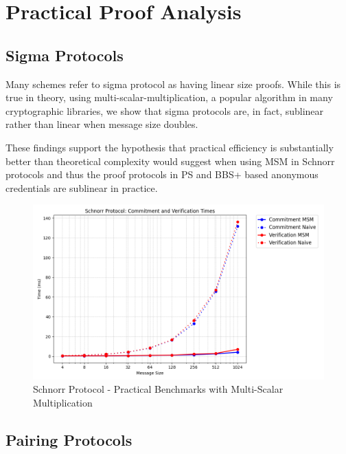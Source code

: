 \section{Practical Proof Analysis}
\subsection{Sigma Protocols}\label{sigma-protocol-analysis}
Many schemes refer to sigma protocol as having linear size proofs. 
While this is true in theory, using multi-scalar-multiplication, a popular algorithm in many cryptographic libraries, we show that sigma protocols are, in fact, sublinear rather than linear when message size doubles.

These findings support the hypothesis that practical efficiency is substantially better than theoretical complexity would suggest when using MSM in Schnorr protocols and thus the proof protocols in PS and BBS+ based anonymous credentials are sublinear in practice.

\begin{figure}
    \centering
    \includegraphics[width=0.75\linewidth]{schnorr_msm_no_msm.png}
    \caption{Schnorr Protocol - Practical Benchmarks with Multi-Scalar Multiplication}
    \label{fig:schnorr-benchmarks}
\end{figure}




\subsection{Pairing Protocols}

